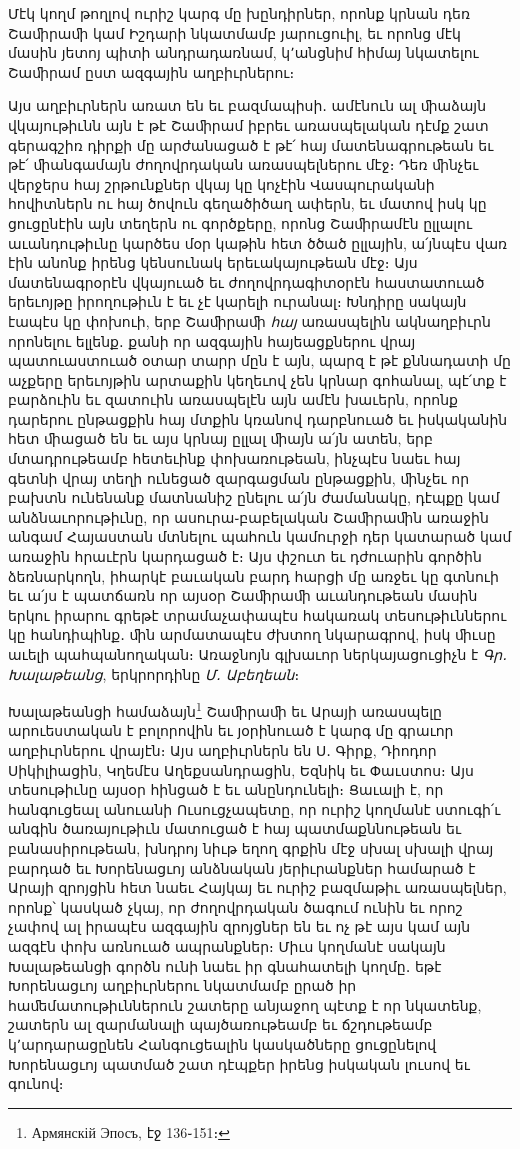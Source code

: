 \documentclass{article}
\begin{document}
{Մէկ կողմ թողլով ուրիշ կարգ մը խընդիրներ, որոնք կրնան դեռ Շաﬕրաﬕ կամ Իշդարի նկատմամբ յարուցուիլ, եւ որոնց մէկ մասին յետոյ պիտի անդրադառնամ, կ՚անցնիմ հիմայ նկատելու Շաﬕրամ ըստ ազգային աղբիւրներու։

Այս աղբիւրներն առատ են եւ բազմապիսի․ ամէնուն ալ ﬕաձայն վկայութիւնն այն է թէ Շաﬕրամ իբրեւ առասպելական դէմք շատ գերագշիռ դիրքի մը արժանացած է թէ՛ հայ մատենագրութեան եւ թէ՛ ﬕանգամայն ժողովրդական առասպելներու մէջ։ Դեռ ﬕնչեւ վերջերս հայ շրթունքներ վկայ կը կոչէին Վասպուրականի հովիտներն ու հայ ծովուն գեղածիծաղ ափերն, եւ մատով իսկ կը ցուցընէին այն տեղերն ու գործքերը, որոնց Շաﬕրամէն ըլլալու աւանդութիւնը կարծես մօր կաթին հետ ծծած ըլլային, ա՛յնպէս վառ էին անոնք իրենց կենսունակ երեւակայութեան մէջ։ Այս մատենագրօրէն վկայուած եւ ժողովրդագիտօրէն հաստատուած երեւոյթը իրողութիւն է եւ չէ կարելի ուրանալ։ Խնդիրը սակայն էապէս կը փոխուի, երբ Շաﬕրաﬕ \emph{հայ} առասպելին ակնաղբիւրն որոնելու ելլենք․ քանի որ ազգային հայեացքներու վրայ պատուաստուած օտար տարր մըն է այն, պարզ է թէ քննադատի մը աչքերը երեւոյթին արտաքին կեղեւով չեն կրնար գոհանալ, պէ՛տք է բարձուին եւ զատուին առասպելէն այն ամէն խաւերն, որոնք դարերու ընթացքին հայ մտքին կռանով դարբնուած եւ իսկականին հետ ﬕացած են եւ այս կրնայ ըլլալ ﬕայն ա՛յն ատեն, երբ մտադրութեամբ հետեւինք փոխառութեան, ինչպէս նաեւ հայ գետնի վրայ տեղի ունեցած զարգացման ընթացքին, ﬕնչեւ որ բախտն ունենանք մատնանիշ ընելու ա՛յն ժամանակը, դէպքը կամ անձնաւորութիւնը, որ ասուրա֊բաբելական Շաﬕրաﬕն առաջին անգամ Հայաստան մտնելու պահուն կամուրջի դեր կատարած կամ առաջին հրաւէրն կարդացած է։ Այս փշուտ եւ դժուարին գործին ձեռնարկողն, իհարկէ բաւական բարդ հարցի մը առջեւ կը գտնուի եւ ա՛յս է պատճառն որ այսօր Շաﬕրաﬕ աւանդութեան մասին երկու իրարու գրեթէ տրամաչափապէս հակառակ տեսութիւններու կը հանդիպինք․ ﬕն արմատապէս ժխտող նկարագրով, իսկ ﬕւսը աւելի պահպանողական։ Առաջնոյն գլխաւոր ներկայացուցիչն է \emph{Գր․ Խալաթեանց}, երկրորդինը \emph{Մ․ Աբեղեան}։

Խալաթեանցի համաձայն\footnote{Армянскій Эпосъ, էջ 136֊151։} Շաﬕրաﬕ եւ Արայի առասպելը արուեստական է բոլորովին եւ յօրինուած է կարգ մը գրաւոր աղբիւրներու վրայէն։ Այս աղբիւրներն են Ս․ Գիրք, Դիոդոր Սիկիլիացին, Կղեմէս Աղեքսանդրացին, Եզնիկ եւ Փաւստոս։ Այս տեսութիւնը այսօր հինցած է եւ անընդունելի։ Ցաւալի է, որ հանգուցեալ անուանի Ուսուցչապետը, որ ուրիշ կողմանէ ստուգի՛ւ անգին ծառայութիւն մատուցած է հայ պատմաքննութեան եւ բանասիրութեան, խնդրոյ նիւթ եղող գրքին մէջ սխալ սխալի վրայ բարդած եւ Խորենացւոյ անձնական յերիւրանքներ համարած է Արայի զրոյցին հետ նաեւ Հայկայ եւ ուրիշ բազմաթիւ առասպելներ, որոնք՝ կասկած չկայ, որ ժողովրդական ծագում ունին եւ որոշ չափով ալ իրապէս ազգային զրոյցներ են եւ ոչ թէ այս կամ այն ազգէն փոխ առնուած ապրանքներ։ Միւս կողմանէ սակայն Խալաթեանցի գործն ունի նաեւ իր գնահատելի կողմը․ եթէ Խորենացւոյ աղբիւրներու նկատմամբ ըրած իր հաﬔմատութիւններուն շատերը անյաջող պէտք է որ նկատենք, շատերն ալ զարմանալի պայծառութեամբ եւ ճշդութեամբ կ՚արդարացընեն Հանգուցեալին կասկածները ցուցընելով Խորենացւոյ պատմած շատ դէպքեր իրենց իսկական լուսով եւ գունով։

}
\end{document}
